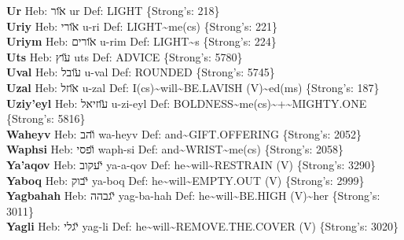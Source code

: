 {\textbf{Ur} Heb: {\large\H אור} ur Def: LIGHT \{Strong's: 218\}\hfill{}\\

\textbf{Uriy} Heb: {\large\H אורי} u-ri Def: LIGHT\textasciitilde{}me(cs) \{Strong's: 221\}\hfill{}\\

\textbf{Uriym} Heb: {\large\H אורים} u-rim Def: LIGHT\textasciitilde{}s \{Strong's: 224\}\hfill{}\\

\textbf{Uts} Heb: {\large\H עוץ} uts Def: ADVICE \{Strong's: 5780\}\hfill{}\\

\textbf{Uval} Heb: {\large\H עובל} u-val Def: ROUNDED \{Strong's: 5745\}\hfill{}\\

\textbf{Uzal} Heb: {\large\H אוזל} u-zal Def: I(cs)\textasciitilde{}will\textasciitilde{}BE.LAVISH (V)\textasciitilde{}ed(ms) \{Strong's: 187\}\hfill{}\\

\textbf{Uziy'eyl} Heb: {\large\H עוזיאל} u-zi-eyl Def: BOLDNESS\textasciitilde{}me(cs)\textasciitilde{}+\textasciitilde{}MIGHTY.ONE \{Strong's: 5816\}\hfill{}\\

\textbf{Waheyv} Heb: {\large\H והב} wa-heyv Def: and\textasciitilde{}GIFT.OFFERING \{Strong's: 2052\}\hfill{}\\

\textbf{Waphsi} Heb: {\large\H ופסי} waph-si Def: and\textasciitilde{}WRIST\textasciitilde{}me(cs) \{Strong's: 2058\}\hfill{}\\

\textbf{Ya'aqov} Heb: {\large\H יעקוב} ya-a-qov Def: he\textasciitilde{}will\textasciitilde{}RESTRAIN (V) \{Strong's: 3290\}\hfill{}\\

\textbf{Yaboq} Heb: {\large\H יבוק} ya-boq Def: he\textasciitilde{}will\textasciitilde{}EMPTY.OUT (V) \{Strong's: 2999\}\hfill{}\\

\textbf{Yagbahah} Heb: {\large\H יגבהה} yag-ba-hah Def: he\textasciitilde{}will\textasciitilde{}BE.HIGH (V)\textasciitilde{}her \{Strong's: 3011\}\hfill{}\\

\textbf{Yagli} Heb: {\large\H יגלי} yag-li Def: he\textasciitilde{}will\textasciitilde{}REMOVE.THE.COVER (V) \{Strong's: 3020\}\hfill{}\\

}
